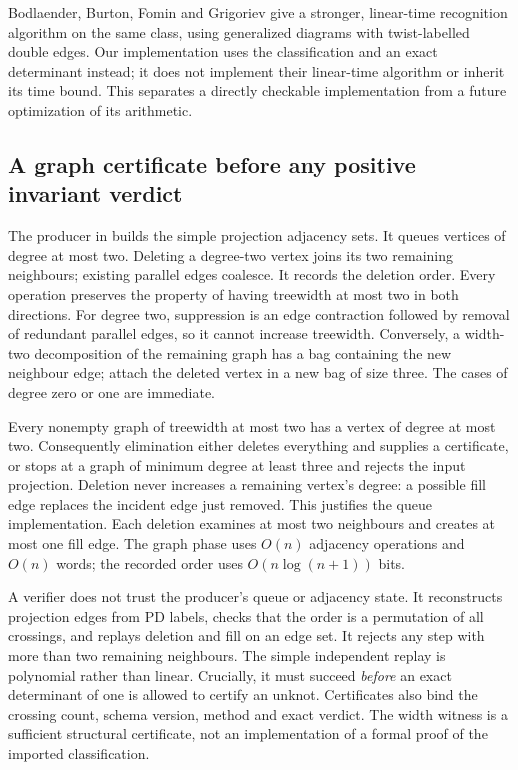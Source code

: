 Bodlaender, Burton, Fomin and Grigoriev \cite{bodlaender-treewidth-two}
give a stronger, linear-time recognition algorithm on the same class,
using generalized diagrams with twist-labelled double edges.  Our
implementation uses the classification and an exact determinant instead;
it does not implement their linear-time algorithm or inherit its time
bound.  This separates a directly checkable implementation from a future
optimization of its arithmetic.

\subsection{A graph certificate before any positive invariant verdict}

The producer in  builds the simple
projection adjacency sets.  It queues vertices of degree at most two.
Deleting a degree-two vertex joins its two remaining neighbours; existing
parallel edges coalesce.  It records the deletion order.  Every operation
preserves the property of having treewidth at most two in both directions.
For degree two, suppression is an edge contraction followed by removal of
redundant parallel edges, so it cannot increase treewidth.  Conversely, a
width-two decomposition of the remaining graph has a bag containing the
new neighbour edge; attach the deleted vertex in a new bag of size three.
The cases of degree zero or one are immediate.

Every nonempty graph of treewidth at most two has a vertex of degree at
most two.  Consequently elimination either deletes everything and supplies
a certificate, or stops at a graph of minimum degree at least three and
rejects the input projection.  Deletion never increases a remaining
vertex's degree: a possible fill edge replaces the incident edge just
removed.  This justifies the queue implementation.  Each deletion examines
at most two neighbours and creates at most one fill edge.  The graph phase
uses $O(n)$ adjacency operations and $O(n)$ words; the recorded order uses
$O(n\log(n+1))$ bits.

A verifier does not trust the producer's queue or adjacency state.  It
reconstructs projection edges from PD labels, checks that the order is a
permutation of all crossings, and replays deletion and fill on an edge set.
It rejects any step with more than two remaining neighbours.  The simple
independent replay is polynomial rather than linear.  Crucially, it must
succeed \emph{before} an exact determinant of one is allowed to certify an
unknot.  Certificates also bind the crossing count, schema version, method
and exact verdict.  The width witness is a sufficient structural certificate,
not an implementation of a formal proof of the imported classification.

